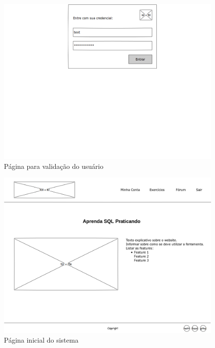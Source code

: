 \documentclass[graduacao,brazil]{ThesisPUC}
\begin{document}
\begin{figure}[H]
    \centering
    \includegraphics[width=\linewidth]{Imagens/LoginPage.png}
    \caption{P\'{a}gina para valida\c{c}\~{a}o do usu\'{a}rio}
\end{figure}

\begin{figure}[H]
    \centering
    \includegraphics[width=\linewidth]{Imagens/WelcomePage.png}
    \caption{P\'{a}gina inicial do sistema}
\end{figure}
\end{document}
